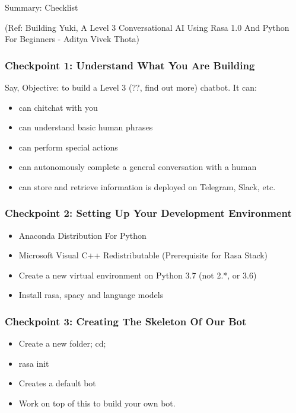 \begin{frame}[fragile]\frametitle{}
\begin{center}
{\Large Summary: Checklist}

{\tiny (Ref: Building Yuki, A Level 3 Conversational AI Using Rasa 1.0 And Python For Beginners - Aditya Vivek Thota) }

\end{center}
\end{frame}


\begin{frame}\frametitle{Checkpoint 1: Understand What You Are Building}
Say, Objective: to build a Level 3 (??, find out more) chatbot. It can:
\begin{itemize}
\item can chitchat with you
\item can understand basic human phrases
\item can perform special actions
\item can autonomously complete a general conversation with a human
\item can store and retrieve information 
is deployed on Telegram, Slack, etc.
\end{itemize}
\end{frame}

\begin{frame}\frametitle{Checkpoint 2: Setting Up Your Development Environment}
\begin{itemize}
\item Anaconda Distribution For Python
\item Microsoft Visual C++ Redistributable (Prerequisite for Rasa Stack) 
\item Create a new virtual environment on Python 3.7 (not 2.*, or 3.6)
\item Install rasa, spacy and language models
\end{itemize}
\end{frame}

\begin{frame}\frametitle{Checkpoint 3: Creating The Skeleton Of Our Bot}
\begin{itemize}
\item Create a new folder; cd;
\item rasa init
\item Creates a default bot 
\item Work on top of this to build your own bot.
\end{itemize}
\end{frame}

